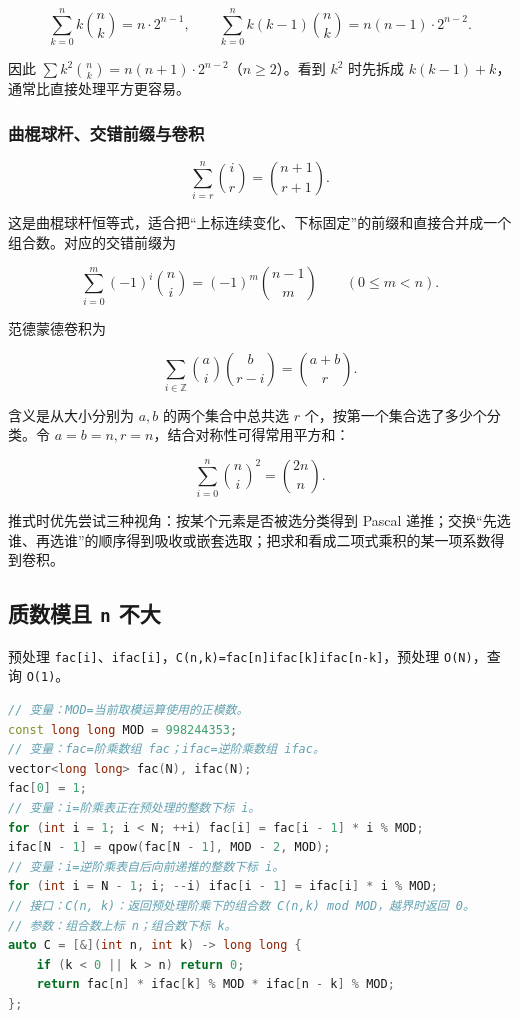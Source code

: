 \[
\sum_{k=0}^{n}k\binom{n}{k}=n\cdot2^{n-1},\qquad
\sum_{k=0}^{n}k(k-1)\binom{n}{k}=n(n-1)\cdot2^{n-2}.
\]

因此 \(\sum k^2\binom{n}{k}=n(n+1)\cdot2^{n-2}\)（\(n\ge2\)）。看到 \(k^2\) 时先拆成
\(k(k-1)+k\)，通常比直接处理平方更容易。

\subsubsection{曲棍球杆、交错前缀与卷积}

\[
\sum_{i=r}^{n}\binom{i}{r}=\binom{n+1}{r+1}.
\]

这是曲棍球杆恒等式，适合把“上标连续变化、下标固定”的前缀和直接合并成一个组合数。对应的交错前缀为

\[
\sum_{i=0}^{m}(-1)^i\binom{n}{i}
=(-1)^m\binom{n-1}{m}
\qquad(0\le m<n).
\]

范德蒙德卷积为

\[
\sum_{i\in\mathbb Z}\binom{a}{i}\binom{b}{r-i}
=\binom{a+b}{r}.
\]

含义是从大小分别为 \(a,b\) 的两个集合中总共选 \(r\) 个，按第一个集合选了多少个分类。令
\(a=b=n,r=n\)，结合对称性可得常用平方和：

\[
\sum_{i=0}^{n}\binom{n}{i}^{2}=\binom{2n}{n}.
\]

推式时优先尝试三种视角：按某个元素是否被选分类得到 Pascal 递推；交换“先选谁、再选谁”的顺序得到吸收或嵌套选取；把求和看成二项式乘积的某一项系数得到卷积。

\subsection{\texorpdfstring{质数模且 \texttt{n} 不大}{质数模且 n 不大}}\label{ux8d28ux6570ux6a21ux4e14-n-ux4e0dux5927}

预处理 \passthrough{\lstinline!fac[i]!}、\passthrough{\lstinline!ifac[i]!}，\passthrough{\lstinline!C(n,k)=fac[n]ifac[k]ifac[n-k]!}，预处理 \passthrough{\lstinline!O(N)!}，查询 \passthrough{\lstinline!O(1)!}。

\begin{lstlisting}[language={C++}]
// 变量：MOD=当前取模运算使用的正模数。
const long long MOD = 998244353;
// 变量：fac=阶乘数组 fac；ifac=逆阶乘数组 ifac。
vector<long long> fac(N), ifac(N);
fac[0] = 1;
// 变量：i=阶乘表正在预处理的整数下标 i。
for (int i = 1; i < N; ++i) fac[i] = fac[i - 1] * i % MOD;
ifac[N - 1] = qpow(fac[N - 1], MOD - 2, MOD);
// 变量：i=逆阶乘表自后向前递推的整数下标 i。
for (int i = N - 1; i; --i) ifac[i - 1] = ifac[i] * i % MOD;
// 接口：C(n, k)：返回预处理阶乘下的组合数 C(n,k) mod MOD，越界时返回 0。
// 参数：组合数上标 n；组合数下标 k。
auto C = [&](int n, int k) -> long long {
    if (k < 0 || k > n) return 0;
    return fac[n] * ifac[k] % MOD * ifac[n - k] % MOD;
};
\end{lstlisting}

